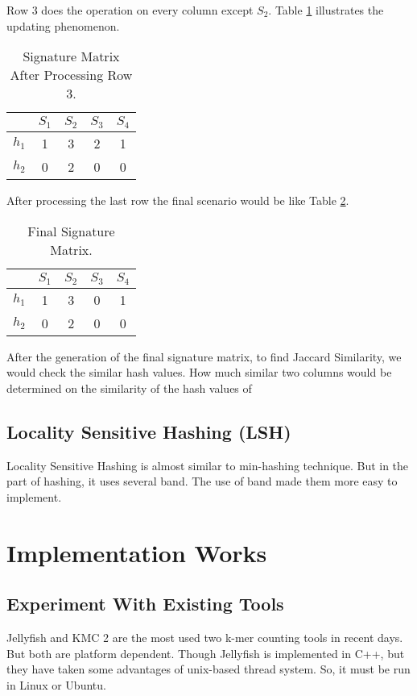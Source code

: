\documentclass{standalone}
\begin{document}
Row 3 does the operation on every column except $S_2$. Table \ref{tab:minhash5} illustrates the updating phenomenon.
\begin{table}[ht]
\centering
\caption{Signature Matrix After Processing Row 3.}
\label{tab:minhash5}
\begin{tabular}{c||c|c|c|c}
   & $S_1$ & $S_2$ & $S_3$ & $S_4$ \\ \hline 
$h_1$ &  \cellcolor[HTML]{FFCE93}1  &  3  &  \cellcolor[HTML]{FFCE93}2  & \cellcolor[HTML]{FFCE93}1   \\
$h_2$ & \cellcolor[HTML]{FD6864}0   & 2   & \cellcolor[HTML]{FD6864}0   & \cellcolor[HTML]{FD6864}0 
\end{tabular}
\end{table}

After processing the last row the final scenario would be like Table \ref{tab:minhash6}.
\begin{table}[ht]
\centering
\caption{Final Signature Matrix.}
\label{tab:minhash6}
\begin{tabular}{c||c|c|c|c}
   & $S_1$ & $S_2$ & $S_3$ & $S_4$ \\ \hline 
$h_1$ &  1  &  3  &  \cellcolor[HTML]{FD6864}0  & 1   \\
$h_2$ & 0   & 2   & \cellcolor[HTML]{FFCE93}0   & 0 
\end{tabular}
\end{table}

After the generation of the final signature matrix, to find Jaccard Similarity, we would check the similar hash values. How much similar two columns would be determined on the similarity of the hash values of 
\subsection{Locality Sensitive Hashing (LSH)}
Locality Sensitive Hashing is almost similar to min-hashing technique. But in the part of hashing, it uses several band. The use of band made them more easy to implement.
\section{Implementation Works}

\subsection{Experiment With Existing Tools}
Jellyfish and KMC 2 are the most used two k-mer counting tools in recent days. But both are platform dependent. Though Jellyfish is implemented in C++, but they have taken some advantages of unix-based thread system. So, it must be run in Linux or Ubuntu.
\end{document}
